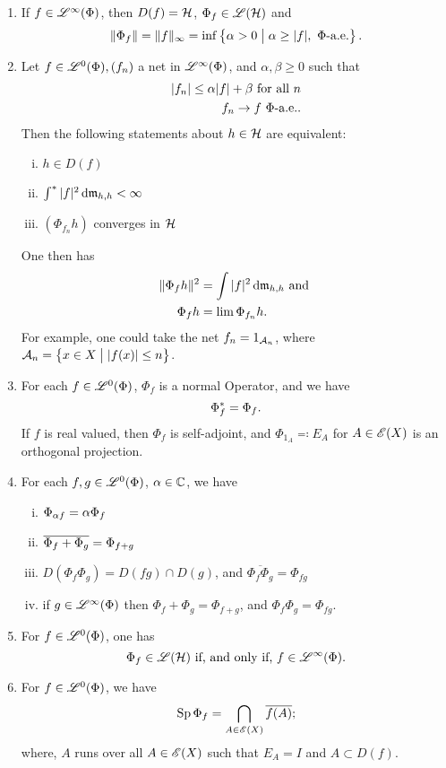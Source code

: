 \begin{thrm}
  \leavevmode
  \begin{enumerate}
   \item   

 If $f \in \mathscr{L}^\infty (\Phi)$, then $D(f) = \mathcal{H}$, $ \Phi_f \in \mathscr{L}(\mathcal{H})$ and
 \[
 \| \Phi_f \| = \| f\|_\infty = \inf \left\lbrace \alpha > 0 \bigm | \alpha \geq |f|, ~\Phi\text{-a.e.}\right\rbrace.
 \]

 
\item 
Let $f \in \mathscr{L}^0(\Phi), (f_n)$ a net in $\mathscr{L}^\infty (\Phi)$, and $\alpha, \beta \geq 0$ such that
 \begin{align*}
   | f_n | \leq \alpha |f| + \beta \text{ for all } n \\
   f_n \to f ~\Phi\text{-a.e.}.
 \end{align*}
Then the following statements about $h \in \mathcal{H}$ are equivalent:
\begin{enumerate}[(i)]
 \item $h \in D(f)$
 \item $\int ^{*} | f| ^2 \operatorname{d}\! \mathfrak{m}_{h,h} < \infty$
 \item $(\Phi_{f_n}h)$ converges in $ \mathcal{H}$
\end{enumerate}
One then has
\begin{align*}
  \| \Phi_f h \| ^2 &= \int |f|^2 \operatorname{d}\! \mathfrak{m}_{h, h } \text{ and }\\
  \Phi_{f }h &= \lim \Phi_{f_n} h.
\end{align*}
For example, one could take the net $f_n = 1_{\mathcal{A}_n}$, where
$\mathcal{A}_n = \left\lbrace x \in X \bigm | | f(x) | \leq n \right\rbrace$.

\item
For each $f \in \mathscr{L}^0(\Phi)$, $\Phi_f$ is a normal Operator, and we have
\[
 \Phi_f ^{*} = \Phi_f. 
\]
If $f$ is real valued, then $\Phi_f$ is self-adjoint, and $\Phi_{1_A} 
\eqqcolon E_A$ for $ A \in \mathscr{E}(X)$ is an orthogonal projection. 

\item 
For each $f, g \in \mathscr{L}^0(\Phi)$, $\alpha \in \mathbb{C}$, we have

\begin{enumerate}[(i)]
  \item $\Phi_{\alpha f} = \alpha \Phi_f$
  \item $ \overline{\Phi_f + \Phi_g} = \Phi_{f + g}$
  \item $D(\Phi_f \Phi_g) = D(fg) \cap D(g)$, and $\overline{\Phi_f \Phi_g}
  = \Phi_{fg}$
  \item if $g \in \mathscr{L}^\infty (\Phi)$ then $\Phi_f + \Phi_g = \Phi_{f+g}$, and 
  $\Phi_f \Phi_g = \Phi_{fg}$.
\end{enumerate}

\item
For $f \in \mathscr{L}^0(\Phi)$, one has
\[
\Phi_f \in \mathscr{L}(\mathcal{H}) \text{ if, and only if, } f \in \mathscr{L}^\infty (\Phi).
\]

\item
For $f \in \mathscr{L}^0(\Phi)$, we have
\[
\operatorname{Sp} \Phi_f = \bigcap_{A \in \mathscr{E}(X)} \overline{f(A)};
\]
where, $A$ runs over all $A \in \mathscr{E}(X)$ such that $E_A = I$ and $A \subset D(f)$.


\end{enumerate}

\end{thrm}













